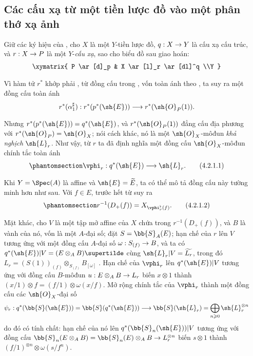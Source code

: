 \documentclass[oneside,10pt]{amsart}
\makeatletter
\renewcommand{\geq}{\geqslant}
\newcommand{\ega@arrow}[2]{\mathchoice{#1}{#2}{#2}{#2}}
\renewcommand{\to}{\ega@arrow{\longrightarrow}{\rightarrow}}
\newcommand{\oldpage}[2][]{\marginnote{\normalfont\footnotesize\textbf{#1}~|~#2}\ignorespaces}
\let\EGAOriginalLabel\label
\renewcommand{\label}[1]{\phantomsection\EGAOriginalLabel{#1}}
\makeatother
\begin{document}
\subsection{Các cấu xạ từ một tiền lược đồ vào một phân thớ xạ ảnh}
\label{subsection:II.4.2}

\begin{env}[4.2.1]
\label{II.4.2.1}
Giữ các ký hiệu của , cho $X$ là một $Y$-tiền lược đồ, $q:X\to Y$ là cấu xạ cấu trúc, và $r:X\to P$ là một $Y$-\emph{cấu xạ}, sao cho biểu đồ sau giao hoán:
\[
  \xymatrix{
    P \ar[d]_p & X \ar[l]_r \ar[dl]^q
  \\Y
  }
\]
\oldpage[II]{73}

Vì hàm tử $r^*$ khớp phải , từ đồng cấu trong , vốn toàn ánh theo , ta suy ra một đồng cấu toàn ánh
\[
  r^*(\alpha_1^\sharp): r^*(p^*(\sh{E})) \to r^*(\sh{O}_P(1)).
\]

Nhưng $r^*(p^*(\sh{E}))=q^*(\sh{E})$, và $r^*(\sh{O}_P(1))$ đẳng cấu địa phương với $r^*(\sh{O}_P)=\sh{O}_X$; nói cách khác, nó là một $\sh{O}_X$-môđun \emph{khả nghịch} $\sh{L}_r$.
Như vậy, từ $r$ ta đã định nghĩa một đồng cấu $\sh{O}_X$-môđun chính tắc toàn ánh
\[
\label{II.4.2.1.1}
  \vphi_r:q^*(\sh{E}) \to \sh{L}_r.
  \tag{4.2.1.1}
\]

Khi $Y=\Spec(A)$ là affine và $\sh{E}=\widetilde{E}$, ta có thể mô tả đồng cấu này tường minh hơn như sau.
Với $f\in E$, trước hết từ  suy ra
\[
\label{II.4.2.1.2}
  r^{-1}(D_+(f)) = X_{\vphi_r^\flat(f)}.
  \tag{4.2.1.2}
\]

Mặt khác, cho $V$ là một tập mở affine của $X$ chứa trong $r^{-1}(D_+(f))$, và $B$ là vành của nó, vốn là một $A$-đại số;
đặt $S=\bb{S}_A(E)$;
hạn chế của $r$ lên $V$ tương ứng với một đồng cấu $A$-đại số $\omega:S_{(f)}\to B$, và ta có $q^*(\sh{E})|V=(E\otimes_A B)\supertilde$ cùng $\sh{L}_r|V=\widetilde{L_r}$, trong đó $L_r=(S(1))_{(f)}\otimes_{S_{(f)}}B_{[\omega]}$ .
Hạn chế của $\vphi_r$ lên $q^*(\sh{E})|V$ tương ứng với đồng cấu $B$-môđun $u:E\otimes_A B\to L_r$ biến $x\otimes1$ thành $(x/1)\otimes f=(f/1)\otimes\omega(x/f)$.
Mở rộng chính tắc của $\vphi_r$ thành một đồng cấu các $\sh{O}_X$-đại số
\[
  \psi_r: q^*(\bb{S}(\sh{E})) = \bb{S}(q^*(\sh{E})) \to \bb{S}(\sh{L}_r) = \bigoplus_{n\geq0}\sh{L}_r^{\otimes n}
\]
do đó có tính chất: hạn chế của nó lên $q^*(\bb{S}_n(\sh{E}))|V$ tương ứng với đồng cấu $\bb{S}_n(E\otimes_A B)=\bb{S}_n(E)\otimes_A B\to L_r^{\otimes n}$ biến $s\otimes1$ thành $(f/1)^{\otimes n}\otimes\omega(s/f^n)$.
\end{env}
\end{document}
